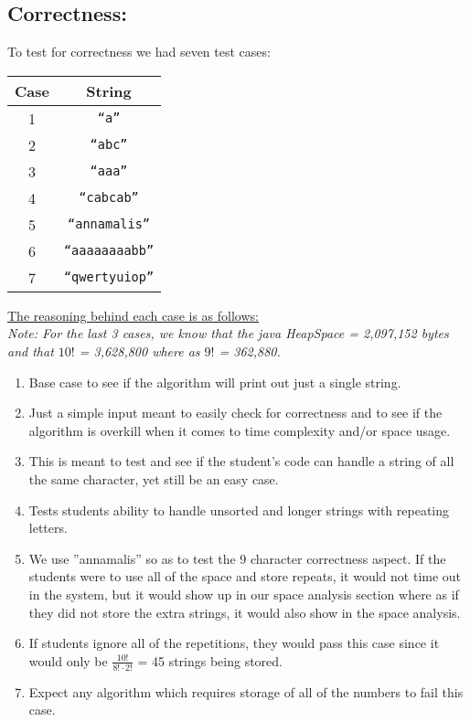 \documentclass[12pt]{article}
\begin{document}
\subsection{Correctness:}
To test for correctness we had seven test cases:
\begin{table}[H]
	\centering
	\begin{tabular}{cc}
		\toprule
		Case & String \\
		\midrule
		1 & \texttt{``a''} \\
		2 & \texttt{``abc''} \\
		3 & \texttt{``aaa''} \\
		4 & \texttt{``cabcab''} \\
		5 & \texttt{``annamalis''} \\
		6 & \texttt{``aaaaaaaabb''} \\
		7 & \texttt{``qwertyuiop''} \\
		\bottomrule
	\end{tabular}
\end{table}
\noindent \underline{The reasoning behind each case is as follows:} \\
\em{Note: For the last 3 cases, we know that the java HeapSpace = 2,097,152 bytes and that $10!$ = 3,628,800
    where as $9!$ = 362,880.}
\begin{enumerate}
\item Base case to see if the algorithm will print out just a single string.
\item Just a simple input meant to easily check for correctness and to see if the
algorithm is overkill when it comes to time complexity and/or space usage.
\item This is meant to test and see if the student's code can handle a string of all
the same character, yet still be an easy case.
\item Tests students ability to handle unsorted and longer strings with repeating letters.
\item We use ''annamalis'' so as to test the 9 character correctness aspect. If the students
were to use all of the space and store repeats, it would not time out in the system, but it
would show up in our space analysis section where as if they did not store the extra
strings, it would also show in the space analysis.
\item If students ignore all of the repetitions, they would pass this case since it would only be $\frac{10!}{8!\cdot 2!}$ = 45 strings being stored.
\item Expect any algorithm which requires storage of all of the numbers to fail this case.
\end{enumerate}
\end{document}
